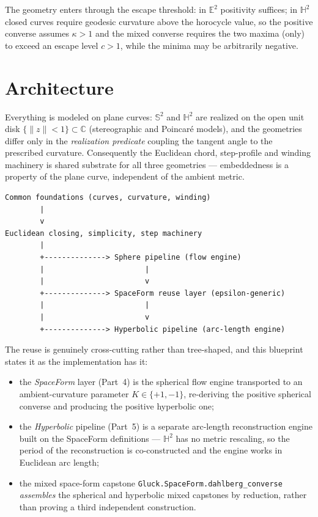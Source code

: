 The geometry enters through the escape threshold: in $\mathbb{E}^2$ positivity
suffices; in $\mathbb{H}^2$ closed curves require geodesic curvature above the
horocycle value, so the positive converse assumes $\kappa>1$ and the mixed
converse requires the two maxima (only) to exceed an escape level $c>1$, while
the minima may be arbitrarily negative.

\section{Architecture}

Everything is modeled on plane curves: $\mathbb{S}^2$ and $\mathbb{H}^2$ are
realized on the open unit disk $\{\lVert z\rVert<1\}\subset\mathbb{C}$
(stereographic and Poincar\'e models), and the geometries differ only in the
\emph{realization predicate} coupling the tangent angle to the prescribed
curvature. Consequently the Euclidean chord, step-profile and winding
machinery is shared substrate for all three geometries --- embeddedness is a
property of the plane curve, independent of the ambient metric.

\begin{verbatim}
Common foundations (curves, curvature, winding)
        |
        v
Euclidean closing, simplicity, step machinery
        |
        +--------------> Sphere pipeline (flow engine)
        |                       |
        |                       v
        +--------------> SpaceForm reuse layer (epsilon-generic)
        |                       |
        |                       v
        +--------------> Hyperbolic pipeline (arc-length engine)
\end{verbatim}

The reuse is genuinely cross-cutting rather than tree-shaped, and this
blueprint states it as the implementation has it:
\begin{itemize}
\item the \emph{SpaceForm} layer (Part~4) is the spherical flow engine
  transported to an ambient-curvature parameter $K\in\{+1,-1\}$, re-deriving
  the positive spherical converse and producing the positive hyperbolic one;
\item the \emph{Hyperbolic} pipeline (Part~5) is a separate arc-length
  reconstruction engine built on the SpaceForm definitions --- $\mathbb{H}^2$
  has no metric rescaling, so the period of the reconstruction is
  co-constructed and the engine works in Euclidean arc length;
\item the mixed space-form capstone
  \texttt{Gluck.SpaceForm.dahlberg\_converse} \emph{assembles} the
  spherical and hyperbolic mixed capstones by reduction, rather than proving a
  third independent construction.
\end{itemize}

